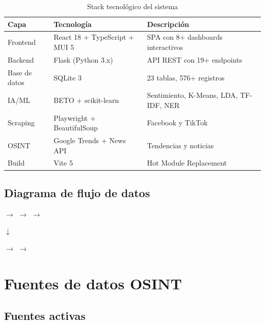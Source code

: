 \documentclass[11pt,a4paper]{article}
\begin{document}
\begin{table}[H]
\centering
\begin{tabularx}{\textwidth}{l l X}
\toprule
\textbf{Capa} & \textbf{Tecnología} & \textbf{Descripción} \\
\midrule
Frontend & React 18 + TypeScript + MUI 5 & SPA con 8+ dashboards interactivos \\
\rowcolor{tablerow}
Backend & Flask (Python 3.x) & API REST con 19+ endpoints \\
Base de datos & SQLite 3 & 23 tablas, 576+ registros \\
\rowcolor{tablerow}
IA/ML & BETO + scikit-learn & Sentimiento, K-Means, LDA, TF-IDF, NER \\
Scraping & Playwright + BeautifulSoup & Facebook y TikTok \\
\rowcolor{tablerow}
OSINT & Google Trends + News API & Tendencias y noticias \\
Build & Vite 5 & Hot Module Replacement \\
\bottomrule
\end{tabularx}
\caption{Stack tecnológico del sistema}
\end{table}

\subsection{Diagrama de flujo de datos}

\begin{center}
 $\longrightarrow$
 $\longrightarrow$
 $\longrightarrow$

\vspace{0.3cm}
$\downarrow$
\vspace{0.3cm}

 $\longrightarrow$
 $\longrightarrow$
\end{center}

\section{Fuentes de datos OSINT}

\subsection{Fuentes activas}
\end{document}
